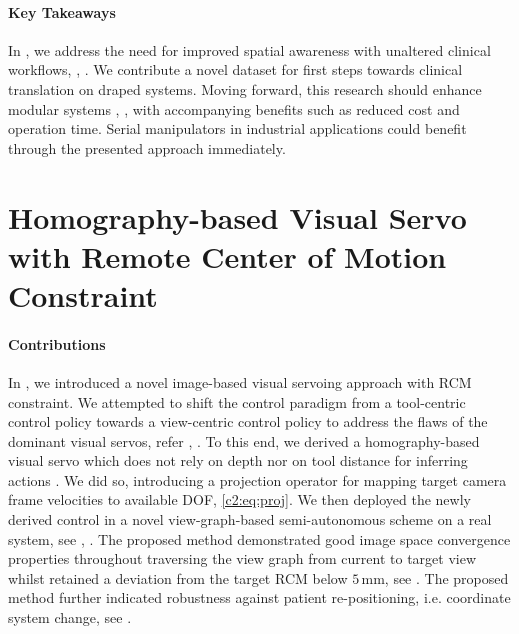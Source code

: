 \paragraph{Key Takeaways}
In , we address the need for improved spatial awareness with unaltered clinical workflows, , . We contribute a novel dataset for first steps towards clinical translation on draped systems. Moving forward, this research should enhance modular systems , , with accompanying benefits such as reduced cost and operation time. Serial manipulators in industrial applications could benefit through the presented approach immediately.

\section{Homography-based Visual Servo with Remote Center of Motion Constraint}
\label{con:sec:visual_servo}
\paragraph{Contributions} In , we introduced a novel image-based visual servoing approach with RCM constraint. We attempted to shift the control paradigm from a tool-centric control policy towards a view-centric control policy to address the flaws of the dominant visual servos, refer , . To this end, we derived a homography-based visual servo which does not rely on depth nor on tool distance for inferring actions . We did so, introducing a projection operator for mapping target camera frame velocities to available DOF, \eqref{c2:eq:proj}. We then deployed the newly derived control in a novel view-graph-based semi-autonomous scheme on a real system, see , . The proposed method demonstrated good image space convergence properties throughout traversing the view graph from current to target view whilst retained a deviation from the target RCM below $5\,\text{mm}$, see . The proposed method further indicated robustness against patient re-positioning, i.e. coordinate system change, see .


